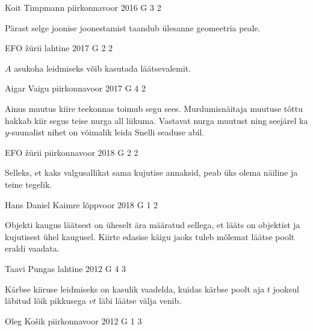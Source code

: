 \documentclass[11pt]{article}
\begin{document}
{%
{Koit Timpmann} %
{piirkonnavoor} %
{2016} %
{G 3} %
{2} %
{

\ifHint
Pärast selge joonise joonestamist taandub ülesanne geomeetria peale.
\fi
}

{EFO žürii} %
{lahtine} %
{2017} %
{G 2} %
{2} %
{

\ifHint
$A$ asukoha leidmiseks võib kasutada läätsevalemit.
\fi
}

{Aigar Vaigu} %
{piirkonnavoor} %
{2017} %
{G 4} %
{2} %
{

\ifHint
Ainus muutus kiire teekonnas toimub segu sees. Murdumisnäitaja muutuse tõttu hakkab kiir segus teise nurga all liikuma. Vastavat nurga muutust ning seejärel ka $y$-suunalist nihet on võimalik leida Snelli seaduse abil.
\fi
}

{EFO žürii} %
{piirkonnavoor} %
{2018} %
{G 2} %
{2} %
{

\ifHint
Selleks, et kaks valgusallikat sama kujutise annaksid, peab üks olema näiline ja teine tegelik.
\fi
}

{Hans Daniel Kaimre} %
{lõppvoor} %
{2018} %
{G 1} %
{2} %
{

\ifHint
Objekti kaugus läätsest on üheselt ära määratud sellega, et lääts on objektist ja kujutisest ühel kaugusel. Kiirte edasise käigu jaoks tuleb mõlemat läätse poolt eraldi vaadata.
\fi
}

{Taavi Pungas} %
{lahtine} %
{2012} %
{G 4} %
{3} %
{

\ifHint
Kärbse kiiruse leidmiseks on kasulik vaadelda, kuidas kärbse poolt aja $t$ jooksul läbitud lõik pikkusega $vt$ läbi läätse välja venib.
\fi
}

{Oleg Košik} %
{piirkonnavoor} %
{2012} %
{G 1} %
{3} %
{

}}
\end{document}
